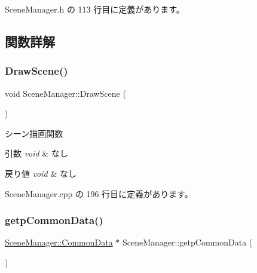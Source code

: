  Scene\+Manager.\+h の 113 行目に定義があります。



\subsection{関数詳解}
\mbox{\label{class_scene_manager_a828b35826f757b8af34aa767c6b40378}} 
\subsubsection{\texorpdfstring{Draw\+Scene()}{DrawScene()}}
{\footnotesize\ttfamily void Scene\+Manager\+::\+Draw\+Scene (\begin{DoxyParamCaption}{ }\end{DoxyParamCaption})}



シーン描画関数 


\begin{DoxyParams}{引数}
{\em void} & なし \\
\hline
\end{DoxyParams}

\begin{DoxyRetVals}{戻り値}
{\em void} & なし \\
\hline
\end{DoxyRetVals}


 Scene\+Manager.\+cpp の 196 行目に定義があります。

\mbox{\label{class_scene_manager_a4de42577d81672dee3e79300e745553c}} 
\subsubsection{\texorpdfstring{getp\+Common\+Data()}{getpCommonData()}}
{\footnotesize\ttfamily \mbox{\hyperlink{class_scene_manager_1_1_common_data}{Scene\+Manager\+::\+Common\+Data}} $\ast$ Scene\+Manager\+::getp\+Common\+Data (\begin{DoxyParamCaption}{ }\end{DoxyParamCaption})}



